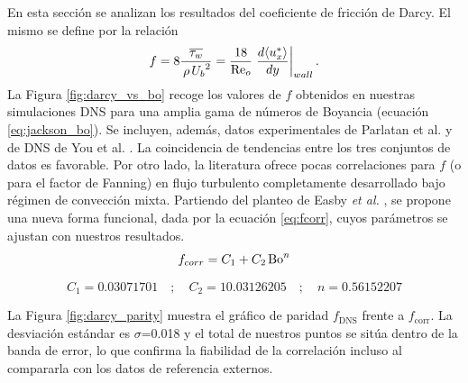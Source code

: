 En esta sección se analizan los resultados del coeficiente de fricción de Darcy. El mismo se define por la relación
\begin{equation}
f = 8 \frac{ \overline{\tau_w}}{\hspace{0.5mm} \rho \hspace{0.5mm} {U_b}^2 }  = \frac{18}{\text{Re}_o} \left.\frac{d \langle u^*_x \rangle}{dy}\right\vert_{wall} \text{.}
\label{eq:darcy}
\end{equation}
La Figura \ref{fig:darcy_vs_bo} recoge los valores de $f$ obtenidos en nuestras simulaciones DNS para una amplia gama de números de Boyancia (ecuación \ref{eq:jackson_bo}). Se incluyen, además, datos experimentales de Parlatan et al. \cite{parlatan1996buoyancy} y de DNS de You et al. \cite{you2003direct}. La coincidencia de tendencias entre los tres conjuntos de datos es favorable. Por otro lado, la literatura ofrece pocas correlaciones para $f$ (o para el factor de Fanning) en flujo turbulento completamente desarrollado bajo régimen de convección mixta. Partiendo del planteo de Easby \textit{et al.} \cite{easby1978effect}, se propone una nueva forma funcional, dada por la ecuación \ref{eq:fcorr}, cuyos parámetros se ajustan con nuestros resultados.
\begin{equation}
f_{corr} = C_1 + C_2 \hspace*{0.5mm} \text{Bo}^n
\label{eq:fcorr}
\end{equation}

\begin{small}
$$
C_1 = 0.03071701 \quad ; \quad C_2 = 10.03126205 \quad ; \quad n = 0.56152207
$$
\end{small}

La Figura \ref{fig:darcy_parity} muestra el gráfico de paridad $f_{\text{DNS}}$ frente a $f_{\text{corr}}$. La desviación estándar es $\sigma$=0.018 y el total de nuestros puntos se sitúa dentro de la banda de error, lo que confirma la fiabilidad de la correlación incluso al compararla con los datos de referencia externos.

